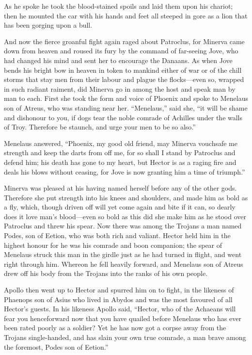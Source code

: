As he spoke he took the blood-stained spoils and laid them upon his
chariot; then he mounted the car with his hands and feet all steeped in
gore as a lion that has been gorging upon a bull.

And now the fierce groanful fight again raged about Patroclus, for Minerva
came down from heaven and roused its fury by the command of far-seeing
Jove, who had changed his mind and sent her to encourage the Danaans. As
when Jove bends his bright bow in heaven in token to mankind either of war
or of the chill storms that stay men from their labour and plague the
flocks—even so, wrapped in such radiant raiment, did Minerva go in
among the host and speak man by man to each. First she took the form and
voice of Phoenix and spoke to Menelaus son of Atreus, who was standing
near her. “Menelaus,” said she, “it will be shame and dishonour to you, if
dogs tear the noble comrade of Achilles under the walls of Troy. Therefore
be staunch, and urge your men to be so also.”

Menelaus answered, “Phoenix, my good old friend, may Minerva vouchsafe me
strength and keep the darts from off me, for so shall I stand by Patroclus
and defend him; his death has gone to my heart, but Hector is as a raging
fire and deals his blows without ceasing, for Jove is now granting him a
time of triumph.”

Minerva was pleased at his having named herself before any of the other
gods. Therefore she put strength into his knees and shoulders, and made
him as bold as a fly, which, though driven off will yet come again and
bite if it can, so dearly does it love man’s blood—even so bold as
this did she make him as he stood over Patroclus and threw his spear. Now
there was among the Trojans a man named Podes, son of Eetion, who was both
rich and valiant. Hector held him in the highest honour for he was his
comrade and boon companion; the spear of Menelaus struck this man in the
girdle just as he had turned in flight, and went right through him.
Whereon he fell heavily forward, and Menelaus son of Atreus drew off his
body from the Trojans into the ranks of his own people.

Apollo then went up to Hector and spurred him on to fight, in the likeness
of Phaenops son of Asius who lived in Abydos and was the most favoured of
all Hector’s guests. In his likeness Apollo said, “Hector, who of the
Achaeans will fear you henceforward now that you have quailed before
Menelaus who has ever been rated poorly as a soldier? Yet he has now got a
corpse away from the Trojans single-handed, and has slain your own true
comrade, a man brave among the foremost, Podes son of Eetion.”

